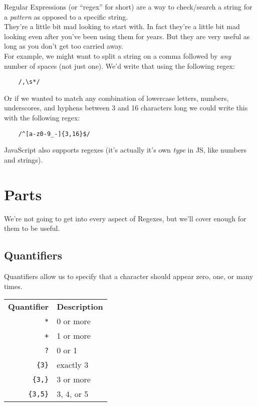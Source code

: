 Regular Expressions (or ``regex'' for short) are a way to check/search a string for a \textit{pattern} as opposed to a specific string.
\\

They're a little bit mad looking to start with. In fact they're a little bit mad looking even after you've been using them for years. But they are very useful as long as you don't get too carried away.
\\

For example, we might want to split a string on a comma followed by \textit{any} number of spaces (not just one). We'd write that using the following regex:

\begin{verbatim}
    /,\s*/
\end{verbatim}


Or if we wanted to match any combination of lowercase letters, numbers, underscores, and hyphens between 3 and 16 characters long we could write this with the following regex:

\begin{verbatim}
    /^[a-z0-9_-]{3,16}$/
\end{verbatim}

JavaScript also supports regexes (it's actually it's own \textit{type} in JS, like numbers and strings).

\pagebreak


\section{Parts}

We're not going to get into every aspect of Regexes, but we'll cover enough for them to be useful.

\subsection{Quantifiers}

Quantifiers allow us to specify that a character should appear zero, one, or many times.

\begin{center}
    \begin{small}
        \begin{tabu}{r l}
            \textbf{Quantifier}   & \textbf{Description} \\
            \texttt{*}          & 0 or more \\
            \texttt{+}          & 1 or more \\
            \texttt{?}          & 0 or 1 \\
            \texttt{\{3\}}      & exactly 3 \\
            \texttt{\{3,\}}     & 3 or more \\
            \texttt{\{3,5\}}   & 3, 4, or 5
        \end{tabu}
    \end{small}
\end{center}

